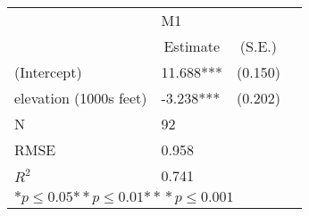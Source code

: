\begin{tabular}{@{}l*{3}{l}@{}}
\hline
  &\multicolumn{2}{l}{M1  }\tabularnewline
 &\multicolumn{1}{c}{Estimate}&\multicolumn{1}{c}{(S.E.)}\tabularnewline
 \hline
 \hline
  (Intercept) & 11.688*** & (0.150) \tabularnewline
  elevation (1000s feet) & -3.238*** & (0.202) \tabularnewline
 \hline
 N&\multicolumn{1}{l}{92}  & \tabularnewline
 RMSE&0.958\tabularnewline
 $R^2$&0.741\tabularnewline
 \hline
\hline
 
 \multicolumn{3}{l}{  ${*  p}\le 0.05$${*\!\!*  p}\le 0.01$${*\!\!*\!\!*  p}\le 0.001$}\tabularnewline
 \end{tabular}